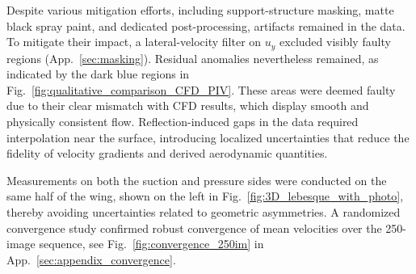 \documentclass[wes, manuscript]{copernicus}
\begin{document}
Despite various mitigation efforts, including support-structure masking, matte black spray paint, and dedicated post-processing, artifacts remained in the data. 
To mitigate their impact, a lateral-velocity filter on $u_{y}$ excluded visibly faulty regions (App.~\ref{sec:masking}). 
Residual anomalies nevertheless remained, as indicated by the dark blue regions in Fig.~\ref{fig:qualitative_comparison_CFD_PIV}. 
These areas were deemed faulty due to their clear mismatch with CFD results, which display smooth and physically consistent flow. Reflection-induced gaps in the data required interpolation near the surface, introducing localized uncertainties that reduce the fidelity of velocity gradients and derived aerodynamic quantities.

Measurements on both the suction and pressure sides were conducted on the same half of the wing, shown on the left in Fig.~\ref{fig:3D_lebesque_with_photo}, thereby avoiding uncertainties related to geometric asymmetries. A randomized convergence study confirmed robust convergence of mean velocities over the 250-image sequence, see Fig.~\ref{fig:convergence_250im} in App.~\ref{sec:appendix_convergence}.
\end{document}
